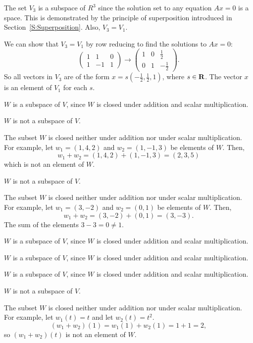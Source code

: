 The set $V_3$ is a subspace of $R^3$ since the solution set to
any equation $Ax = 0$ is a space.  This is demonstrated by the
principle of superposition introduced in Section~\ref{S:Superposition}.
Also, $V_3 = V_1$.  

\para We can show that $V_3 = V_1$ by row reducing to find the
solutions to $Ax = 0$:
\[
\left(\begin{array}{rrr} 1 & 1 & 0 \\ 1 & -1 & 1
\end{array}\right) \longrightarrow \left(\begin{array}{rrr} 1 & 0 &
\frac{1}{2} \\ 0 & 1 & -\frac{1}{2} \end{array}\right).
\]
So all vectors in $V_3$ are of the form $x = s(-\frac{1}{2},
\frac{1}{2}, 1)$, where $s \in \mbox{$\bf{R}$}$.  The vector $x$ is an element
of $V_1$ for each $s$.

\newpage
{} $W$ is a subspace of $V$, since $W$ is closed under
addition and scalar multiplication.

 \ans $W$ is not a subspace of $V$.

\soln The subset $W$ is closed neither under addition nor under scalar
multiplication.  For example, let $w_1 = (1,4,2)$ and $w_2 = (1,-1,3)$
be elements of $W$.  Then,
\[
w_1 + w_2 = (1,4,2) + (1,-1,3) = (2,3,5)
\]
which is not an element of $W$.


 \ans $W$ is not a subspace of $V$.

\soln The subset $W$ is closed neither under addition nor under scalar
multiplication.  For example, let $w_1 = (3,-2)$ and $w_2 = (0,1)$ be
elements of $W$.  Then,
\[
w_1 + w_2 = (3,-2) + (0,1) = (3,-3).
\]
The sum of the elements $3 - 3 = 0 \neq 1$.

 $W$ is a subspace of $V$, since $W$ is closed under
addition and scalar multiplication.

 $W$ is a subspace of $V$, since $W$ is closed under
addition and scalar multiplication.

 $W$ is a subspace of $V$, since $W$ is closed under
addition and scalar multiplication.

 \ans $W$ is not a subspace of $V$.

\soln The subset $W$ is closed neither under addition nor under scalar
multiplication.  For example, let $w_1(t) = t$ and let $w_2(t) = t^2$.
\[
(w_1 + w_2)(1) = w_1(1) + w_2(1) = 1 + 1 = 2,
\]
so $(w_1 + w_2)(t)$ is not an element of $W$.


